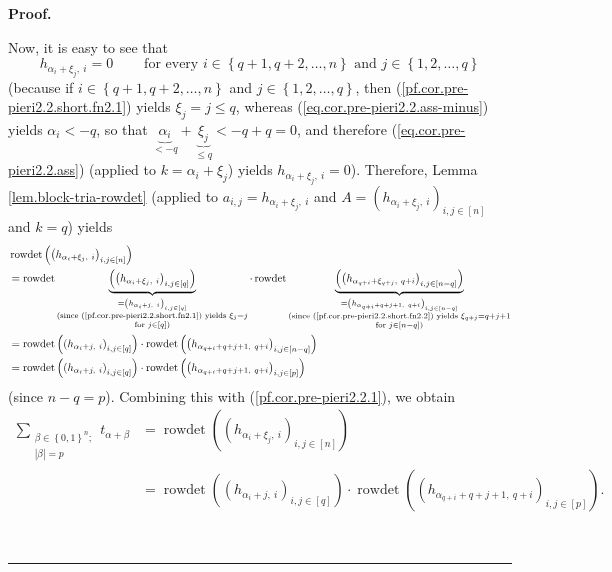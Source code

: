 \documentclass
[numbers=enddot,12pt,final,onecolumn,notitlepage,english]{scrartcl}%
\theoremstyle{definition}
\newenvironment{proof}[1][Proof]{\noindent\textbf{#1.} }{\ \rule{0.5em}{0.5em}}
\let\sumnonlimits\sum
\renewcommand{\sum}{\sumnonlimits\limits}
\newenvironment{verlong}{}{}
\newenvironment{vershort}{}{}
\begin{document}
\begin{proof}
\begin{verlong}
\end{verlong}

\begin{vershort}
Now, it is easy to see that
\[
h_{\alpha_{i}+\xi_{j},\ i}=0\ \ \ \ \ \ \ \ \ \ \text{for every }i\in\left\{
q+1,q+2,\ldots,n\right\}  \text{ and }j\in\left\{  1,2,\ldots,q\right\}
\]
(because if $i\in\left\{  q+1,q+2,\ldots,n\right\}  $ and $j\in\left\{
1,2,\ldots,q\right\}  $, then (\ref{pf.cor.pre-pieri2.2.short.fn2.1}) yields
$\xi_{j}=j\leq q$, whereas (\ref{eq.cor.pre-pieri2.2.ass-minus}) yields
$\alpha_{i}<-q$, so that $\underbrace{\alpha_{i}}_{<-q}+\underbrace{\xi_{j}%
}_{\leq q}<-q+q=0$, and therefore (\ref{eq.cor.pre-pieri2.2.ass}) (applied to
$k=\alpha_{i}+\xi_{j}$) yields $h_{\alpha_{i}+\xi_{j},\ i}=0$). Therefore,
Lemma \ref{lem.block-tria-rowdet} (applied to $a_{i,j}=h_{\alpha_{i}+\xi
_{j},\ i}$ and $A=\left(  h_{\alpha_{i}+\xi_{j},\ i}\right)  _{i,j\in\left[
n\right]  }$ and $k=q$) yields%
\begin{align*}
&  \operatorname*{rowdet}\left(  \left(  h_{\alpha_{i}+\xi_{j},\ i}\right)
_{i,j\in\left[  n\right]  }\right) \\
&  =\operatorname*{rowdet}\underbrace{\left(  \left(  h_{\alpha_{i}+\xi
_{j},\ i}\right)  _{i,j\in\left[  q\right]  }\right)  }_{\substack{=\left(
h_{\alpha_{i}+j,\ i}\right)  _{i,j\in\left[  q\right]  }\\\text{(since
(\ref{pf.cor.pre-pieri2.2.short.fn2.1}) yields }\xi_{j}=j\\\text{for }%
j\in\left[  q\right]  \text{)}}}\cdot\operatorname*{rowdet}\underbrace{\left(
\left(  h_{\alpha_{q+i}+\xi_{q+j},\ q+i}\right)  _{i,j\in\left[  n-q\right]
}\right)  }_{\substack{=\left(  h_{\alpha_{q+i}+q+j+1,\ q+i}\right)
_{i,j\in\left[  n-q\right]  }\\\text{(since
(\ref{pf.cor.pre-pieri2.2.short.fn2.2}) yields }\xi_{q+j}=q+j+1\\\text{for
}j\in\left[  n-q\right]  \text{)}}}\\
&  =\operatorname*{rowdet}\left(  \left(  h_{\alpha_{i}+j,\ i}\right)
_{i,j\in\left[  q\right]  }\right)  \cdot\operatorname*{rowdet}\left(  \left(
h_{\alpha_{q+i}+q+j+1,\ q+i}\right)  _{i,j\in\left[  n-q\right]  }\right) \\
&  =\operatorname*{rowdet}\left(  \left(  h_{\alpha_{i}+j,\ i}\right)
_{i,j\in\left[  q\right]  }\right)  \cdot\operatorname*{rowdet}\left(  \left(
h_{\alpha_{q+i}+q+j+1,\ q+i}\right)  _{i,j\in\left[  p\right]  }\right)
\end{align*}
(since $n-q=p$). Combining this with (\ref{pf.cor.pre-pieri2.2.1}), we obtain%
\begin{align*}
\sum_{\substack{\beta\in\left\{  0,1\right\}  ^{n};\\\left\vert \beta
\right\vert =p}}t_{\alpha+\beta}  &  =\operatorname*{rowdet}\left(  \left(
h_{\alpha_{i}+\xi_{j},\ i}\right)  _{i,j\in\left[  n\right]  }\right) \\
&  =\operatorname*{rowdet}\left(  \left(  h_{\alpha_{i}+j,\ i}\right)
_{i,j\in\left[  q\right]  }\right)  \cdot\operatorname*{rowdet}\left(  \left(
h_{\alpha_{q+i}+q+j+1,\ q+i}\right)  _{i,j\in\left[  p\right]  }\right)  .
\end{align*}


\end{vershort}
\end{proof}
\end{document}
